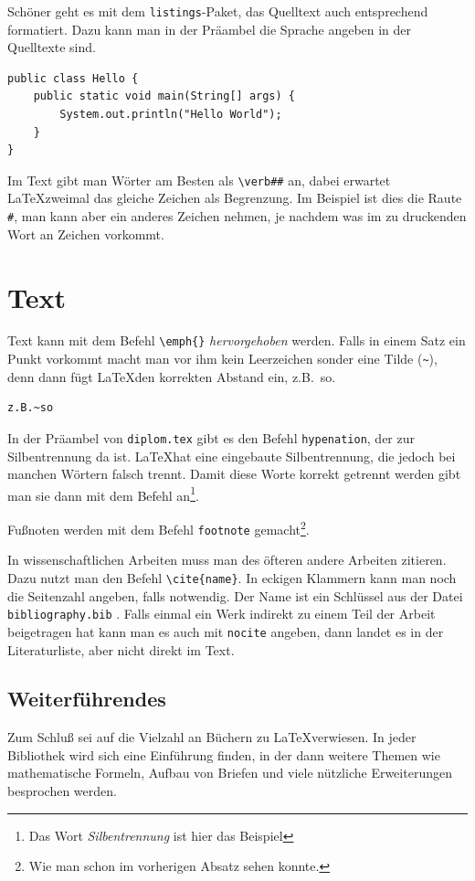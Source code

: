 Schöner geht es mit dem \verb|listings|-Paket, das Quelltext auch entsprechend formatiert. Dazu kann man in der Präambel die Sprache angeben in der Quelltexte sind.

\begin{lstlisting}
public class Hello {
    public static void main(String[] args) {
        System.out.println("Hello World");
    }
}
\end{lstlisting}

Im Text gibt man Wörter am Besten als \verb|\verb##| an, dabei erwartet \LaTeX zweimal das gleiche Zeichen als Begrenzung. Im Beispiel ist dies die Raute \verb|#|, man kann aber ein anderes Zeichen nehmen, je nachdem was im zu druckenden Wort an Zeichen vorkommt.



\section{Text}

Text kann mit dem Befehl \verb|\emph{}| \emph{hervorgehoben} werden. Falls in einem Satz ein Punkt vorkommt macht man vor ihm kein Leerzeichen sonder eine Tilde (\verb|~|), denn dann fügt \LaTeX den korrekten Abstand ein, z.B.~so.

\begin{verbatim}
z.B.~so
\end{verbatim}

In der Präambel von \verb|diplom.tex| gibt es den Befehl \verb|hypenation|, der zur Silbentrennung da ist. \LaTeX hat eine eingebaute Silbentrennung, die jedoch bei manchen Wörtern falsch trennt. Damit diese Worte korrekt getrennt werden gibt man sie dann mit dem Befehl an\footnote{Das Wort \emph{Silbentrennung} ist hier das Beispiel}.

Fußnoten werden mit dem Befehl \verb|footnote| gemacht\footnote{Wie man schon im vorherigen Absatz sehen konnte.}.

In wissenschaftlichen Arbeiten muss man des öfteren andere Arbeiten zitieren. Dazu nutzt man den Befehl \verb|\cite{name}|. In eckigen Klammern kann man noch die Seitenzahl angeben, falls notwendig. Der Name ist ein Schlüssel aus der Datei \verb|bibliography.bib| \cite[S.~10]{kopka}. Falls einmal ein Werk indirekt zu einem Teil der Arbeit beigetragen hat kann man es auch mit \verb|nocite| angeben, dann landet es in der Literaturliste, aber nicht direkt im Text.


\subsection{Weiterführendes}

Zum Schluß sei auf die Vielzahl an Büchern zu \LaTeX verwiesen. In jeder Bibliothek wird sich eine Einführung finden, in der dann weitere Themen wie mathematische Formeln, Aufbau von Briefen und viele nützliche Erweiterungen besprochen werden.

